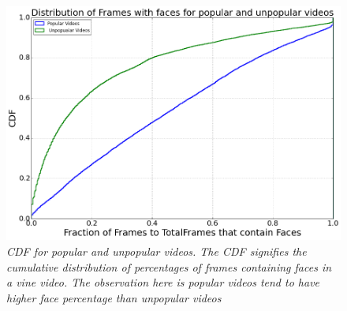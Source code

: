 \begin{figure}[!htb]
\centering
\includegraphics[width=0.6\columnwidth]{plots/FaceCDF}
\caption{\textsl{ CDF for popular and unpopular videos. The CDF signifies the cumulative distribution of percentages of frames containing faces in a vine video. The observation here is popular videos tend to have higher face percentage than unpopular videos}}
\label{fig:Face_CDF}
\end{figure}

